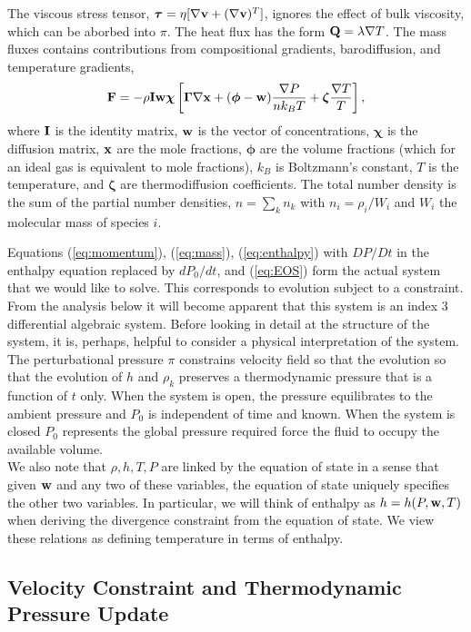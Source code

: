 \documentclass[final]{siamltex}
\def\Fb {{\bf F}}
\def\Ib {{\bf I}}
\def\Qb {{\bf Q}}
\def\vb {{\bf v}}
\def\wb {{\bf w}}
\def\xb {{\bf x}}
\def\chib   {\boldsymbol{\chi}}
\def\Gammab {\boldsymbol{\Gamma}}
\def\phib   {\boldsymbol{\phi}}
\def\taub   {\boldsymbol{\tau}}
\def\zetab  {\boldsymbol{\zeta}}
\begin{document}
The viscous stress tensor,
$\taub = \eta[\nabla\vb + (\nabla\vb)^T]$,
ignores the effect of bulk viscosity, which can be aborbed into $\pi$.
The heat flux has the form $\Qb = \lambda\nabla T$.
The mass fluxes contains contributions from 
compositional gradients, barodiffusion, and temperature gradients,
\begin{equation}
\Fb = -\rho\Ib\wb\chib\left[\Gammab\nabla\xb + (\phib - \wb)\frac{\nabla P}{n k_B T} + \zetab\frac{\nabla T}{T}\right],
\end{equation}
where $\Ib$ is the identity matrix, $\wb$ is the vector of concentrations,
$\chib$ is the diffusion matrix, $\xb$ are the mole fractions,
$\phib$ are the volume fractions (which for an ideal gas is equivalent to mole fractions),
$k_B$ is Boltzmann's constant,
$T$ is the temperature, and $\zetab$ are thermodiffusion coefficients.  The total
number density is the sum of the partial number densities, $n=\sum_kn_k$ with
$n_i=\rho_i/W_i$ and $W_i$ the molecular mass of species $i$.

Equations (\ref{eq:momentum}), (\ref{eq:mass}), (\ref{eq:enthalpy})
with $DP/Dt$ in the enthalpy equation replaced by $dP_0/dt$, and (\ref{eq:EOS})
form the actual system that we would like to solve.
This corresponds to evolution subject to a constraint.  From the analysis below it 
will become apparent that this system is an index 3 differential algebraic system.
Before looking in detail at the structure of the system, it is, perhaps, helpful to 
consider a physical interpretation of the
system.  The perturbational pressure $\pi$ constrains velocity field so that
the evolution so that the evolution of $h$ and $\rho_k$
preserves a thermodynamic pressure that is a function of $t$ only.
When the system is open, the pressure
equilibrates to the ambient pressure and $P_0$ is independent of time and known.
When the system is closed
$P_0$ represents the global pressure
required force the fluid to occupy the available volume.\\

We also note that $\rho, h, T, P$ are linked by the equation of state in a sense that given
$\wb$ and any two of these variables, the equation of state uniquely specifies the other
two variables.  In particular, we will think of enthalpy as $h = h(P,\wb,T)$ when deriving
the divergence constraint from the equation of state.
We view these relations as defining temperature in terms of enthalpy.

\subsection{Velocity Constraint and Thermodynamic Pressure Update}
\end{document}

